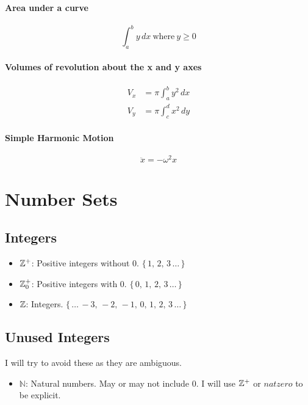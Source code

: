 \subsubsection{Area under a curve}
\[
    \int_a^b y\,dx \ \text{where} \ y\geq 0
\]

\subsubsection{Volumes of revolution about the x and y axes}
\begin{align*}
    V_x &= \pi\int_a^b y^2 \,dx\\
    V_y &= \pi\int_c^d x^2 \, dy
\end{align*}

\subsubsection{Simple Harmonic Motion}
\[\ddot{x}=-\omega^2x\]



\chapter{Number Sets}
\section{Integers}
\begin{itemize}
    \item $\mathbb{Z}^+$: Positive integers without $0$. $\{\,1,\, 2,\, 3\,\dots\,\}$
    \item $\mathbb{Z}^+_0$: Positive integers with $0$. $\{\,0,\,1,\, 2,\, 3\,\dots\,\}$
    \item $\mathbb{Z}$: Integers. $\{\, \dots \,-3,\,-2,\,-1,\,0,\,1,\,2,\,3\,\dots\,\}$
\end{itemize}
\section{Unused Integers}
I will try to avoid these as they are ambiguous.
\begin{itemize}
    \item $\mathbb{N}$: Natural numbers. May or may not include $0$. I will use 
            $\mathbb{Z}^+$ or $natzero$ to be explicit.
\end{itemize}
